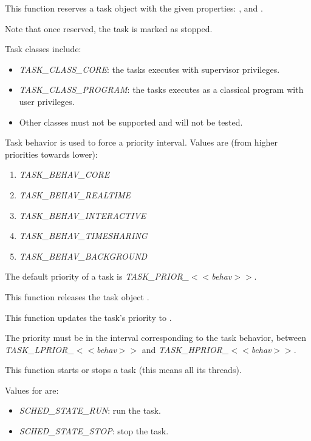 {
  This function reserves a task object with the given
  properties: ,  and
  .

  Note that once reserved, the task is marked as stopped.

  Task classes include:

  \begin{itemize}
  \item
    \emph{TASK\_CLASS\_CORE}: the tasks executes with
    supervisor privileges.
  \item
    \emph{TASK\_CLASS\_PROGRAM}: the tasks executes as a
    classical program with user privileges.
  \item
    Other classes must not be supported and will not be
    tested.
  \end{itemize}

  Task behavior is used to force a priority interval. Values
  are (from higher priorities towards lower):

  \begin{enumerate}
  \item \emph{TASK\_BEHAV\_CORE}
  \item \emph{TASK\_BEHAV\_REALTIME}
  \item \emph{TASK\_BEHAV\_INTERACTIVE}
  \item \emph{TASK\_BEHAV\_TIMESHARING}
  \item \emph{TASK\_BEHAV\_BACKGROUND}
  \end{enumerate}

  The default priority of a task is
  \emph{TASK\_PRIOR\_$<<$behav$>>$}.
}

\newpage

{
  This function releases the task object .
}

{
  This function updates the task's priority to .

  The priority must be in the interval corresponding to the
  task behavior, between \emph{TASK\_LPRIOR\_$<<$behav$>>$} and
  \emph{TASK\_HPRIOR\_$<<$behav$>>$}.
}

{
  This function starts or stops a task (this means all its
  threads).

  Values for  are:

  \begin{itemize}
  \item
    \emph{SCHED\_STATE\_RUN}: run the task.
  \item
    \emph{SCHED\_STATE\_STOP}: stop the task.
  \end{itemize}
}

